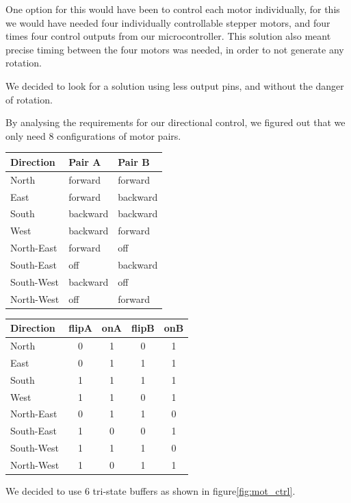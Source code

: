 One option for this would have been to control each motor individually,
for this we would have needed four individually controllable stepper motors,
and four times four control outputs from our microcontroller.
This solution also meant precise timing between the four motors was needed,
in order to not generate any rotation.

We decided to look for a solution using less output pins,
and without the danger of rotation.

By analysing the requirements for our directional control,
we figured out that we only need 8 configurations of motor pairs.
\begin{center}
\begin{tabular}{|l|l|l|}
	\hline
	Direction & Pair A & Pair B	\\
	\hline
	North & forward & forward \\
	East 	& forward & backward \\
	South & backward & backward \\
	West 	& backward & forward \\
	\hline
	North-East & forward & off \\
	South-East & off & backward \\
	South-West & backward & off\\
	North-West & off & forward \\
	\hline
\end{tabular}
\begin{tabular}{|l|c|c|c|c|}
	\hline
	Direction & flipA & onA & flipB & onB \\
	\hline
	North & 0 & 1 & 0 & 1 \\
	East 	& 0 & 1 & 1 & 1 \\
	South & 1 & 1 & 1 & 1 \\
	West 	& 1 & 1 & 0 & 1 \\
	\hline
	North-East & 0 & 1 & 1 & 0 \\
	South-East & 1 & 0 & 0 & 1 \\
	South-West & 1 & 1 & 1 & 0 \\
	North-West & 1 & 0 & 1 & 1 \\
	\hline
\end{tabular}
\end{center}

We decided to use 6 tri-state buffers as shown in figure\ref{fig:mot_ctrl}.
